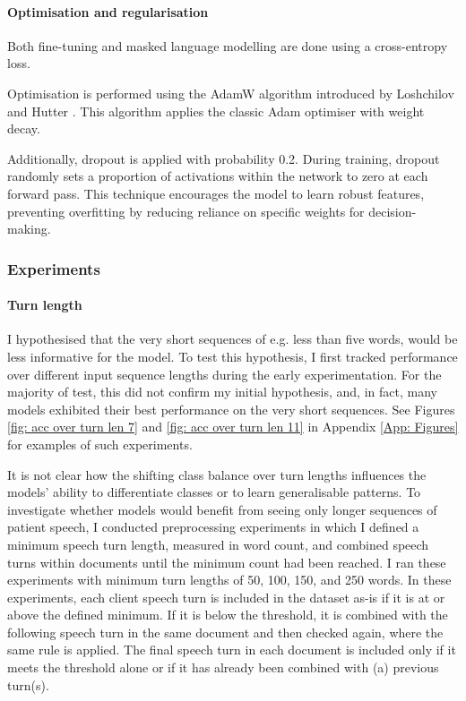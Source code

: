 \documentclass[12pt]{report}
\begin{document}
\paragraph*{Optimisation and regularisation}
Both fine-tuning and masked language modelling are done using a cross-entropy loss.

Optimisation is performed using the AdamW algorithm introduced by Loshchilov and Hutter \citeyear{AdamW}.
This algorithm applies the classic Adam optimiser \cite{Adam} with weight decay.

Additionally, dropout is applied with probability 0.2.
During training, dropout randomly sets a proportion of activations within the network to zero at each forward pass.
This technique encourages the model to learn robust features, preventing overfitting by reducing reliance on specific weights for decision-making.

\subsubsection*{Experiments}
\paragraph*{Turn length}
I hypothesised that the very short sequences of e.g. less than five words, would be less informative for the model.
To test this hypothesis, I first tracked performance over different input sequence lengths during the early experimentation.
For the majority of test, this did not confirm my initial hypothesis, and, in fact, many models exhibited their best performance on the very short sequences.
See Figures \ref{fig: acc over turn len 7} and \ref{fig: acc over turn len 11} in Appendix \ref{App: Figures} for examples of such experiments.

It is not clear how the shifting class balance over turn lengths influences the models' ability to differentiate classes or to learn generalisable patterns.
To investigate whether models would benefit from seeing only longer sequences of patient speech, I conducted preprocessing experiments in which I defined a minimum speech turn length, measured in word count, and combined speech turns within documents until the minimum count had been reached.
I ran these experiments with minimum turn lengths of 50, 100, 150, and 250 words.
In these experiments, each client speech turn is included in the dataset as-is if it is at or above the defined minimum.
If it is below the threshold, it is combined with the following speech turn in the same document and then checked again, where the same rule is applied.
The final speech turn in each document is included only if it meets the threshold alone or if it has already been combined with (a) previous turn(s).
\end{document}
